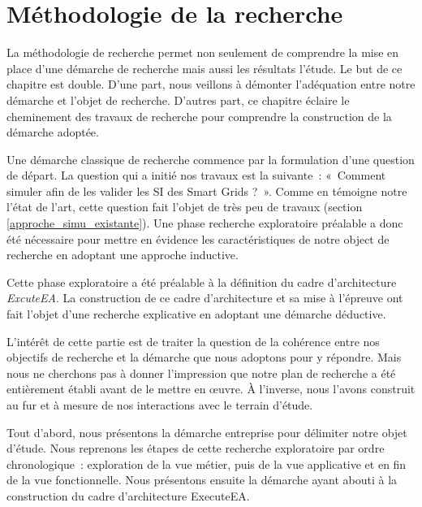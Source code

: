\chapter{Méthodologie de la recherche}
\label{ch:methodo}

\PartialToc

La méthodologie de recherche permet non seulement de comprendre la mise en place 
d'une démarche de recherche mais aussi les résultats l'étude. Le but de ce 
chapitre est double. D'une part, nous veillons à démonter l'adéquation entre 
notre démarche et l'objet de recherche. D'autres part, ce chapitre éclaire le 
cheminement des travaux de recherche pour comprendre la construction de la 
démarche adoptée. 

Une démarche classique de recherche commence par la formulation d'une question 
de départ. La question qui a initié nos travaux est la suivante~: «~Comment 
simuler afin de les valider les SI des Smart Grids ?~».  Comme en témoigne notre 
l'état de l'art, cette question fait l'objet de très peu de travaux (section 
\ref{approche_simu_existante}). Une phase recherche exploratoire préalable a donc été nécessaire 
pour mettre en évidence les caractéristiques de notre object de recherche en adoptant une approche inductive.

Cette phase exploratoire a été préalable à la définition du cadre d'architecture 
\textit{ExcuteEA}. La construction de ce cadre d'architecture et sa mise à 
l'épreuve ont fait l'objet d'une recherche explicative en adoptant une démarche déductive. 

L'intérêt de cette partie est de traiter la question de la cohérence entre nos 
objectifs de recherche et la démarche que nous adoptons pour y répondre. Mais 
nous ne cherchons pas à donner l'impression que notre plan de recherche a été 
entièrement établi avant de le mettre en œuvre. À l'inverse, nous l'avons 
construit au fur et à mesure de nos interactions avec le terrain d'étude. 

Tout d'abord, nous présentons la démarche entreprise pour délimiter 
notre objet d'étude. Nous reprenons les étapes de cette recherche exploratoire 
par ordre chronologique~: exploration de la vue métier, puis de la vue 
applicative et en fin de la vue fonctionnelle. Nous présentons ensuite la 
démarche ayant abouti à la construction du cadre d'architecture ExecuteEA.


